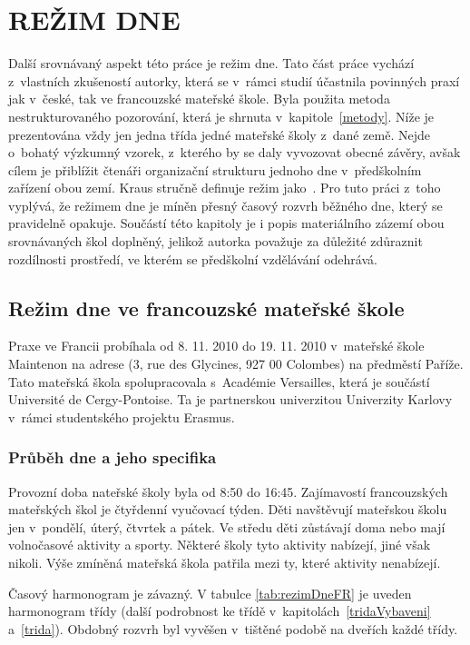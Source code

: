 \chapter{REŽIM DNE}
\label{rezim}
	Další srovnávaný aspekt této práce je režim dne. Tato část práce vychází z~vlastních zkušeností autorky, která se v~rámci studií účastnila povinných praxí jak v~české, tak ve francouzské mateřské škole. Byla použita metoda nestrukturovaného pozorování, která je shrnuta v~kapitole~\ref{metody}. Níže je prezentována vždy jen jedna třída jedné mateřské školy z~dané země. Nejde o~bohatý výzkumný vzorek, z~kterého by se daly vyvozovat obecné závěry, avšak cílem je přiblížit čtenáři organizační strukturu jednoho dne v~předškolním zařízení obou zemí. Kraus stručně definuje režim jako\textit{}~\citep[s.~700]{Kraus}.
	Pro tuto práci z~toho vyplývá, že režimem dne je míněn přesný časový rozvrh běžného dne, který se pravidelně opakuje.
	Součástí této kapitoly je i popis materiálního zázemí obou srovnávaných škol doplněný, jelikož autorka považuje za důležité zdůraznit rozdílnosti prostředí, ve kterém se předškolní vzdělávání odehrává.
	
	\section{Režim dne ve francouzské mateřské škole}

		Praxe ve Francii probíhala od 8. 11. 2010 do 19. 11. 2010 v~mateřské škole Maintenon na adrese (3, rue des Glycines, 927 00 Colombes) na předměstí Paříže. Tato mateřská škola spolupracovala s~Académie Versailles, která je součástí Université de Cergy-Pontoise. Ta je partnerskou univerzitou Univerzity Karlovy v~rámci studentského projektu Erasmus. 


		\subsection{Průběh dne a jeho specifika}

			Provozní doba nateřské školy byla od 8:50 do 16:45. Zajímavostí francouzských mateřských škol je čtyřdenní vyučovací týden. Děti navštěvují mateřskou školu jen v~pondělí, úterý, čtvrtek a pátek. Ve středu děti zůstávají doma nebo mají volnočasové aktivity a sporty. Některé školy tyto aktivity nabízejí, jiné však nikoli. Výše zmíněná mateřská škola patřila mezi ty, které aktivity nenabízejí. 
			
			Časový harmonogram je závazný. V tabulce \ref{tab:rezimDneFR} je uveden harmonogram třídy  (další podrobnost ke třídě v~kapitolách~\ref{tridaVybaveni} a~\ref{trida}). Obdobný rozvrh byl vyvěšen v tištěné podobě na dveřích každé třídy. 

